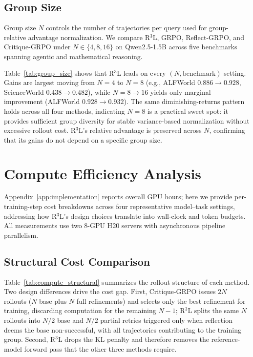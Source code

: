 \documentclass[11pt]{article}
\theoremstyle{definition}
\theoremstyle{remark}
\begin{document}
\subsection{Group Size}
\label{sec:group_size}

Group size $N$ controls the number of trajectories per query used for group-relative advantage normalization. We compare R$^3$L, GRPO, Reflect-GRPO, and Critique-GRPO under $N \in \{4, 8, 16\}$ on Qwen2.5-1.5B across five benchmarks spanning agentic and mathematical reasoning.



Table~\ref{tab:group_size} shows that R$^3$L leads on every $(N, \text{benchmark})$ setting. Gains are largest moving from $N=4$ to $N=8$ (e.g., ALFWorld $0.886 \to 0.928$, ScienceWorld $0.438 \to 0.482$), while $N=8 \to 16$ yields only marginal improvement (ALFWorld $0.928 \to 0.932$). The same diminishing-returns pattern holds across all four methods, indicating $N=8$ is a practical sweet spot: it provides sufficient group diversity for stable variance-based normalization without excessive rollout cost. R$^3$L's relative advantage is preserved across $N$, confirming that its gains do not depend on a specific group size.

\section{Compute Efficiency Analysis}
\label{sec:compute}

Appendix~\ref{app:implementation} reports overall GPU hours; here we provide per-training-step cost breakdowns across four representative model--task settings, addressing how R$^3$L's design choices translate into wall-clock and token budgets. All measurements use two 8-GPU H20 servers with asynchronous pipeline parallelism.

\subsection{Structural Cost Comparison}



Table~\ref{tab:compute_structural} summarizes the rollout structure of each method. Two design differences drive the cost gap. First, Critique-GRPO issues $2N$ rollouts ($N$ base plus $N$ full refinements) and selects only the best refinement for training, discarding computation for the remaining $N{-}1$; R$^3$L splits the same $N$ rollouts into $N/2$ base and $N/2$ partial retries triggered only when reflection deems the base non-successful, with all trajectories contributing to the training group. Second, R$^3$L drops the KL penalty and therefore removes the reference-model forward pass that the other three methods require.
\end{document}
